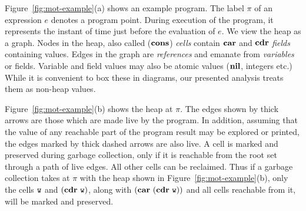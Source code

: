 Figure~\ref{fig:mot-example}(a) shows  an example program.   The label
$\pi$ of an expression $e$  denotes a program point.  During execution
of  the program, it  represents the  instant of  time just  before the
evaluation  of  $e$.  
We  view the  heap  as a graph.  
Nodes in the heap, also  called  ($\mbox{$\mathbf{cons}$}$) {\em  cells\/} contain $\mbox{$\mathbf{car}$}$ and $\mbox{$\mathbf{cdr}$}$ {\em fields}
containing values.  Edges in the graph are {\em references} and
emanate from {\em variables} or fields.
Variable and field values may also be atomic values ($\mbox{$\mathbf{ nil}$}$, integers etc.)
While it is convenient to box these in diagrams, our presented
analysis treats them as non-heap values.

Figure~\ref{fig:mot-example}(b)  shows the heap at $\pi$.
The edges shown  by thick arrows are those  which are made live by the
program. In addition,  assuming that
the value of any reachable part of the program result may be explored
or printed, the edges marked by thick dashed arrows are also live.
A cell  is  marked and preserved  during  garbage collection,  only  if it  is
reachable from the  root set through a path of  live edges.  All other
cells can be  reclaimed.  Thus if  a garbage collection takes
at $\pi$ with the    heap   shown   in
Figure~\ref{fig:mot-example}(b), only the cells $\mbox{\tt w}$ and $(\mbox{$\mathbf{cdr}$}~ \mbox{\tt w})$, along with $(\mbox{$\mathbf{car}$}~(\mbox{$\mathbf{cdr}$}~\mbox{\tt w}))$ and all cells reachable from it,
will be marked and preserved.



\newcommand{\nilfigure}
{\scalebox{0.75}{
\psset{unit=1mm,nodesep=0mm,labelsep=0.5mm}
\begin{pspicture}(0,0)(1,1)
\putnode{start}{origin}{0}{0}{}
\putnode{stop}{origin}{10}{10}{}
\ncline[offsetB=0,nodesepB=0,linewidth=.7]{-}{start}{stop} %
\end{pspicture}
}}


